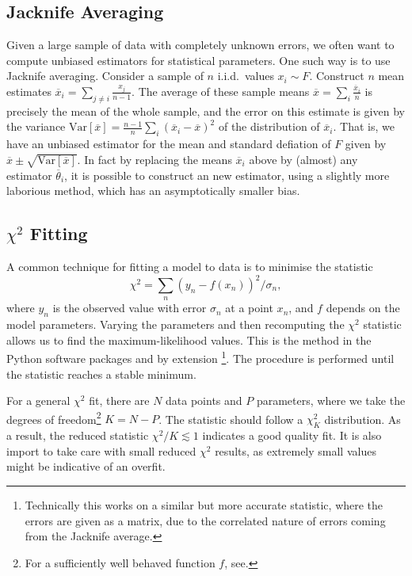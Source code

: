 \documentclass[a4paper,12pt]{article}
\begin{document}
\subsection{Jacknife Averaging}
Given a large sample of data with completely unknown errors, we often want to compute unbiased estimators for statistical parameters. One such way is to use Jacknife averaging\cite{efron1982jackknife}. Consider a sample of $n$ i.i.d.\ values $x_i \sim F$. Construct $n$ mean estimates $\overline{x}_i = \sum_{j\neq i} \frac{x_j}{n-1}$. The average of these sample means $\overline{x} = \sum_i\frac{\overline{x}_i}{n}$ is precisely the mean of the whole sample, and the error on this estimate is given by the variance $\text{Var}[\overline{x}] = \frac{n-1}{n}\sum_i{(\overline{x}_i - \overline{x})}^2$ of the distribution of $\overline{x}_i$. That is, we have an unbiased estimator for the mean and standard defiation of $F$ given by $\overline{x} \pm \sqrt{\text{Var}[\overline{x}]}$. In fact by replacing the means $\overline{x}_i$ above by (almost) any estimator $\overline{\theta}_i$, it is possible to construct an new estimator, using a slightly more laborious method, which has an asymptotically smaller bias\cite{mcintosh2016jackknife}.

\subsection{$\chi^2$ Fitting}
A common technique for fitting a model to data is to minimise the statistic
\begin{equation}
    \chi^2 = \sum_n {(y_n - f(x_n))}^2 / \sigma_n,
\end{equation}
where $y_n$ is the observed value with error $\sigma_n$ at a point $x_n$, and $f$ depends on the model parameters. Varying the parameters and then recomputing the $\chi^2$ statistic allows us to find the maximum-likelihood values. This is the method in the Python software packages  and by extension \cite{lepage2001constrained}\footnote{Technically this works on a similar but more accurate statistic, where the errors are given as a matrix, due to the correlated nature of errors coming from the Jacknife average.}. The procedure is performed until the statistic reaches a stable minimum.

For a general $\chi^2$ fit, there are $N$ data points and $P$ parameters, where we take the degrees of freedom\footnote{For a sufficiently well behaved function $f$, see\cite{andrae2010and}.} $K=N-P$. The statistic should follow a $\chi_K^2$ distribution. As a result, the reduced statistic $\chi^2 / K \lesssim 1$ indicates a good quality fit. It is also import to take care with small reduced $\chi^2$ results, as extremely small values might be indicative of an overfit.
\end{document}
